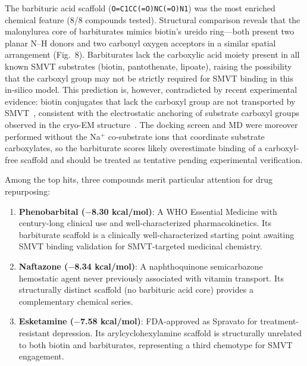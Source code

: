 \documentclass[pdflatex,sn-nature]{sn-jnl}
\begin{document}
The barbituric acid scaffold (\texttt{O=C1CC(=O)NC(=O)N1}) was the most enriched chemical feature (8/8 compounds tested). Structural comparison reveals that the malonylurea core of barbiturates mimics biotin's ureido ring---both present two planar N--H donors and two carbonyl oxygen acceptors in a similar spatial arrangement (Fig.~8). Barbiturates lack the carboxylic acid moiety present in all known SMVT substrates (biotin, pantothenate, lipoate), raising the possibility that the carboxyl group may not be strictly required for SMVT binding in this in-silico model. This prediction is, however, contradicted by recent experimental evidence: biotin conjugates that lack the carboxyl group are not transported by SMVT~\cite{tripathi2025}, consistent with the electrostatic anchoring of substrate carboxyl groups observed in the cryo-EM structure~\cite{zhen2026}. The docking screen and MD were moreover performed without the \mbox{Na$^+$} co-substrate ions that coordinate substrate carboxylates, so the barbiturate scores likely overestimate binding of a carboxyl-free scaffold and should be treated as tentative pending experimental verification.

Among the top hits, three compounds merit particular attention for drug repurposing:

\begin{enumerate}
    \item \textbf{Phenobarbital ($-$8.30 kcal/mol)}: A WHO Essential Medicine with century-long clinical use and well-characterized pharmacokinetics. Its barbiturate scaffold is a clinically well-characterized starting point awaiting SMVT binding validation for SMVT-targeted medicinal chemistry.
    \item \textbf{Naftazone ($-$8.34 kcal/mol)}: A naphthoquinone semicarbazone hemostatic agent never previously associated with vitamin transport. Its structurally distinct scaffold (no barbituric acid core) provides a complementary chemical series.
    \item \textbf{Esketamine ($-$7.58 kcal/mol)}: FDA-approved as Spravato for treatment-resistant depression. Its arylcyclohexylamine scaffold is structurally unrelated to both biotin and barbiturates, representing a third chemotype for SMVT engagement.
\end{enumerate}
\end{document}
